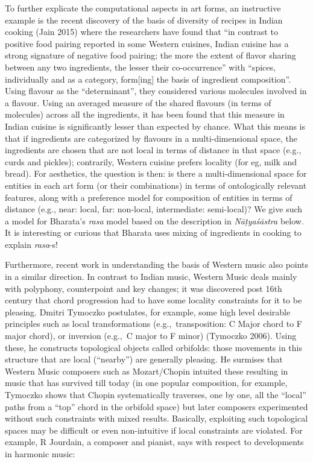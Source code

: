 To further explicate the computational aspects in art forms, an instructive example is the recent discovery of the basis of diversity of recipes in Indian cooking (Jain 2015) where the researchers have found that “in contrast to positive food pairing reported in some Western cuisines, Indian cuisine has a strong signature of negative food pairing; the more the extent of flavor sharing between any two ingredients, the lesser their co-occurrence” with “spices, individually and as a category, form[ing] the basis of ingredient composition”. Using flavour as the “determinant”, they considered various molecules involved in a flavour. Using an averaged measure of the shared flavours (in terms of molecules) across all the ingredients, it has been found that this measure in Indian cuisine is significantly lesser than expected by chance. What this means is that if ingredients are categorized by flavours in a multi-dimensional space, the ingredients are chosen that are not local in terms of distance in that space (e.g., curds and pickles); contrarily, Western cuisine prefers locality (for eg, milk and bread). For aesthetics, the question is then: is there a multi-dimensional space for entities in each art form (or their combinations) in terms of ontologically relevant features, along with a preference model for composition of entities in terms of distance (e.g., near: local, far: non-local, intermediate: semi-local)? We give such a model for Bharata’s \textsl{rasa} model based on the description in \textsl{Nāṭyaśāstra} below. It is interesting or curious that Bharata uses mixing of ingredients in cooking to explain \textsl{rasa}-s!  


Furthermore, recent work in understanding the basis of Western music also points in a similar direction. In contrast to Indian music, Western Music deals mainly with polyphony, counterpoint and key changes; it was discovered post 16th century that chord progression had to have some locality constraints for it to be pleasing. Dmitri Tymoczko postulates, for example, some high level desirable principles such as local transformations (e.g.,~transposition: C Major chord to F major chord), or inversion (e.g.,~C major to F minor) (Tymoczko 2006). Using these, he constructs topological objects called orbifolds: those movements in this structure that are local (“nearby”) are generally pleasing. He surmises that Western Music composers such as Mozart/Chopin intuited these resulting in music that has survived till today (in one popular composition, for example, Tymoczko shows that Chopin systematically traverses, one by one, all the “local” paths from a “top” chord in the orbifold space) but later composers experimented without such constraints with mixed results. Basically, exploiting such topological spaces may be difficult or even non-intuitive if local constraints are violated. For example, R Jourdain, a composer and pianist, says with respect to developments in harmonic music: 

